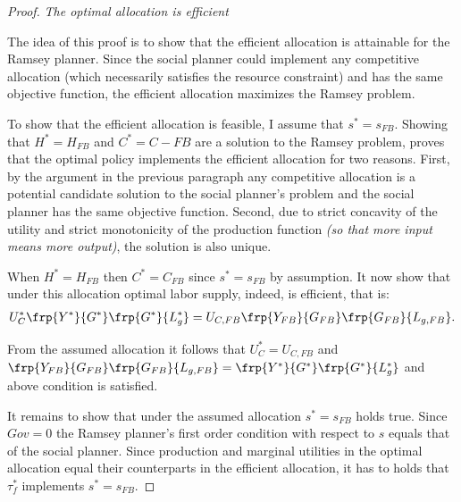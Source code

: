 \begin{proof}\textit{The optimal allocation is efficient}
	
	The idea of this proof is to show that the efficient allocation is attainable for the Ramsey planner. Since the social planner could implement any competitive allocation (which necessarily satisfies the resource constraint) and has the same objective function, the efficient allocation maximizes the Ramsey problem. 
	
	To show that the efficient allocation is feasible, I assume that $s^*=s_{FB}$. Showing that $H^*=H_{FB}$ and $C^*=C-{FB}$ are a solution to the Ramsey problem, proves that the optimal policy implements the efficient allocation for two reasons. First, by the argument in the previous paragraph any competitive allocation is a potential candidate solution to the social planner's problem and the social planner has the same objective function. Second, due to strict concavity of the utility and strict monotonicity of the production function \textit{(so that more input means more output)}, the solution is also unique.
	
	When $H^*=H_{FB}$ then $C^*=C_{FB}$ since $s^*=s_{FB}$ by assumption. It now show that under this allocation optimal labor supply, indeed, is efficient, that is:
	\begin{align}
	U_C^*\frp{Y^*}{G^*}\frp{G^*}{L^*_{g}} = U_{C,FB}\frp{Y_{FB}}{G_{FB}}\frp{G_{FB}}{L_{g,FB}}.
	\end{align}
	
	From the assumed allocation it follows that $U_C^*=U_{C,FB}$ and $\frp{Y_{FB}}{G_{FB}}\frp{G_{FB}}{L_{g,FB}}=\frp{Y^*}{G^*}\frp{G^*}{L^*_{g}}$ and above condition is satisfied. 
	
	It remains to show that under the assumed allocation $s^*=s_{FB}$ holds true. Since $Gov=0$ the Ramsey planner's first order condition with respect to $s$ equals that of the social planner. Since production and marginal utilities in the optimal allocation equal their counterparts in the efficient allocation, it has to holds that $\tau_f^*$ implements $s^*=s_{FB}$.  
	
\end{proof}


